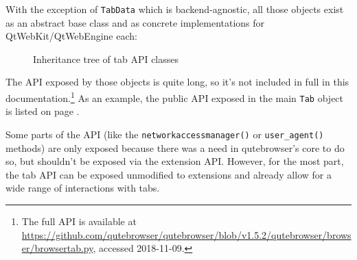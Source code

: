 With the exception of \verb|TabData| which is backend-agnostic, all those
objects exist as an abstract base class and as concrete implementations for
QtWebKit/QtWebEngine each:

\begin{figure}[h]
\begin{center}
\end{center}
\caption{Inheritance tree of tab API classes}
  \label{fig:tabapi-inherit}
\end{figure}

The API exposed by those objects is quite long, so it's not included in full in
this documentation.\footnote{The full API is available at
  \url{https://github.com/qutebrowser/qutebrowser/blob/v1.5.2/qutebrowser/browser/browsertab.py},
accessed 2018-11-09.} As an example, the public API exposed in the main
\verb|Tab| object is listed on page \pageref{lst:tabapi}.

Some parts of the API (like the \verb|networkaccessmanager()| or
\verb|user_agent()| methods) are only exposed because there was a need in
qutebrowser's core to do so, but shouldn't be exposed via the extension API.
However, for the most part, the tab API can be exposed unmodified to extensions
and already allow for a wide range of interactions with tabs.

